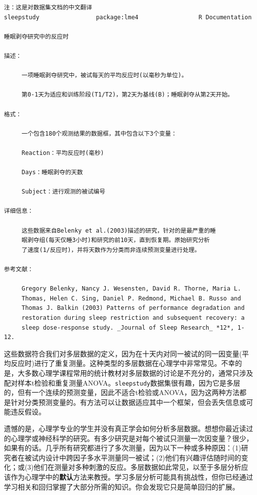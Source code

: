 \documentclass[
]{book}
\begin{document}
\begin{verbatim}
注：这是对数据集文档的中文翻译
sleepstudy                package:lme4                 R Documentation

睡眠剥夺研究中的反应时

描述：

     一项睡眠剥夺研究中，被试每天的平均反应时(以毫秒为单位)。
    
     第0-1天为适应和训练阶段(T1/T2)，第2天为基线(B)；睡眠剥夺从第2天开始。
    
格式：

     一个包含180个观测结果的数据框，其中包含以下3个变量：
    
     Reaction：平均反应时(毫秒)
    
     Days：睡眠剥夺的天数
    
     Subject：进行观测的被试编号

详细信息：

     这些数据来自Belenky et al.(2003)描述的研究，针对的是最严重的睡
     眠剥夺组(每天仅睡3小时)和研究的前10天，直到恢复期。原始研究分析
     了速度(1/反应时)，并将天数作为分类而非连续预测变量进行处理。

参考文献：

     Gregory Belenky, Nancy J. Wesensten, David R. Thorne, Maria L.
     Thomas, Helen C. Sing, Daniel P. Redmond, Michael B. Russo and
     Thomas J. Balkin (2003) Patterns of performance degradation and
     restoration during sleep restriction and subsequent recovery: a
     sleep dose-response study. _Journal of Sleep Research_ *12*, 1-12.
\end{verbatim}

这些数据符合我们对多层数据的定义，因为在十天内对同一被试的同一因变量(平均反应时)进行了重复测量。这种类型的多层数据在心理学中非常常见。不幸的是，大多数心理学课程常用的统计教材对多层数据的讨论是不充分的，通常只涉及配对样本t检验和重复测量ANOVA。\texttt{sleepstudy}数据集很有趣，因为它是多层的，但有一个连续的预测变量，因此不适合t检验或ANOVA，因为这两种方法都是针对分类预测变量的。有方法可以让数据适应其中一个框架，但会丢失信息或可能违反假设。

遗憾的是，心理学专业的学生并没有真正学会如何分析多层数据。想想你最近读过的心理学或神经科学的研究。有多少研究是对每个被试只测量一次因变量？很少，如果有的话。几乎所有研究都进行了多次测量，因为以下一种或多种原因：(1)研究者在被试内设计中跨因子多水平测量同一被试；(2)他们有兴趣评估随时间的变化；或(3)他们在测量对多种刺激的反应。多层数据如此常见，以至于多层分析应该作为心理学中的\textbf{默认}方法来教授。学习多层分析可能具有挑战性，但你已经通过学习相关和回归掌握了大部分所需的知识。你会发现它只是简单回归的扩展。
\end{document}
